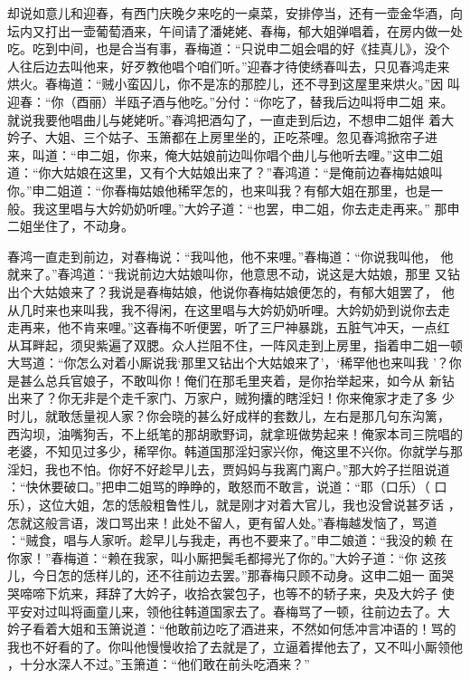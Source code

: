 却说如意儿和迎春，有西门庆晚夕来吃的一桌菜，安排停当，还有一壶金华酒，向
坛内又打出一壶葡萄酒来，午间请了潘姥姥、春梅，郁大姐弹唱着，在房内做一处
吃。吃到中间，也是合当有事，春梅道：“只说申二姐会唱的好《挂真儿》，没个
人往后边去叫他来，好歹教他唱个咱们听。”迎春才待使绣春叫去，只见春鸿走来
烘火。春梅道：“贼小蛮囚儿，你不是冻的那腔儿，还不寻到这屋里来烘火。”因
叫迎春：“你（酉丽）半瓯子酒与他吃。”分付：“你吃了，替我后边叫将申二姐
来。就说我要他唱曲儿与姥姥听。”春鸿把酒勾了，一直走到后边，不想申二姐伴
着大妗子、大姐、三个姑子、玉箫都在上房里坐的，正吃茶哩。忽见春鸿掀帘子进
来，叫道：“申二姐，你来，俺大姑娘前边叫你唱个曲儿与他听去哩。”这申二姐
道：“你大姑娘在这里，又有个大姑娘出来了？”春鸿道：“是俺前边春梅姑娘叫
你。”申二姐道：“你春梅姑娘他稀罕怎的，也来叫我？有郁大姐在那里，也是一
般。我这里唱与大妗奶奶听哩。”大妗子道：“也罢，申二姐，你去走走再来。”
那申二姐坐住了，不动身。

春鸿一直走到前边，对春梅说：“我叫他，他不来哩。”春梅道：“你说我叫他，
他就来了。”春鸿道：“我说前边大姑娘叫你，他意思不动，说这是大姑娘，那里
又钻出个大姑娘来了？我说是春梅姑娘，他说你春梅姑娘便怎的，有郁大姐罢了，
他从几时来也来叫我，我不得闲，在这里唱与大妗奶奶听哩。大妗奶奶到说你去走
走再来，他不肯来哩。”这春梅不听便罢，听了三尸神暴跳，五脏气冲天，一点红
从耳畔起，须臾紫遍了双腮。众人拦阻不住，一阵风走到上房里，指着申二姐一顿
大骂道：“你怎么对着小厮说我‘那里又钻出个大姑娘来了’，‘稀罕他也来叫我
’？你是甚么总兵官娘子，不敢叫你！俺们在那毛里夹着，是你抬举起来，如今从
新钻出来了？你无非是个走千家门、万家户，贼狗攮的瞎淫妇！你来俺家才走了多
少时儿，就敢恁量视人家？你会晓的甚么好成样的套数儿，左右是那几句东沟篱，
西沟坝，油嘴狗舌，不上纸笔的那胡歌野词，就拿班做势起来！俺家本司三院唱的
老婆，不知见过多少，稀罕你。韩道国那淫妇家兴你，俺这里不兴你。你就学与那
淫妇，我也不怕。你好不好趁早儿去，贾妈妈与我离门离户。”那大妗子拦阻说道
：“快休要破口。”把申二姐骂的睁睁的，敢怒而不敢言，说道：“耶（口乐）（
口乐），这位大姐，怎的恁般粗鲁性儿，就是刚才对着大官儿，我也没曾说甚歹话
，怎就这般言语，泼口骂出来！此处不留人，更有留人处。”春梅越发恼了，骂道
：“贼食，唱与人家听。趁早儿与我走，再也不要来了。”申二娘道：“我没的赖
在你家！”春梅道：“赖在我家，叫小厮把鬓毛都撏光了你的。”大妗子道：“你
这孩儿，今日怎的恁样儿的，还不往前边去罢。”那春梅只顾不动身。这申二姐一
面哭哭啼啼下炕来，拜辞了大妗子，收拾衣裳包子，也等不的轿子来，央及大妗子
使平安对过叫将画童儿来，领他往韩道国家去了。春梅骂了一顿，往前边去了。大
妗子看着大姐和玉箫说道：“他敢前边吃了酒进来，不然如何恁冲言冲语的！骂的
我也不好看的了。你叫他慢慢收拾了去就是了，立逼着撵他去了，又不叫小厮领他
，十分水深人不过。”玉箫道：“他们敢在前头吃酒来？”

